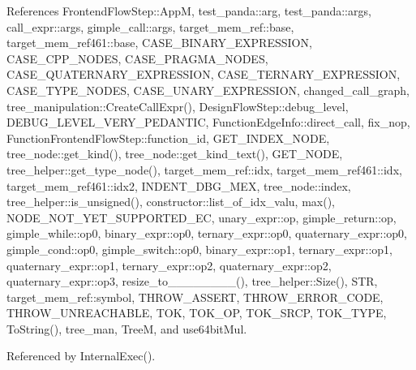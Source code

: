 References Frontend\+Flow\+Step\+::\+AppM, test\+\_\+panda\+::arg, test\+\_\+panda\+::args, call\+\_\+expr\+::args, gimple\+\_\+call\+::args, target\+\_\+mem\+\_\+ref\+::base, target\+\_\+mem\+\_\+ref461\+::base, C\+A\+S\+E\+\_\+\+B\+I\+N\+A\+R\+Y\+\_\+\+E\+X\+P\+R\+E\+S\+S\+I\+ON, C\+A\+S\+E\+\_\+\+C\+P\+P\+\_\+\+N\+O\+D\+ES, C\+A\+S\+E\+\_\+\+P\+R\+A\+G\+M\+A\+\_\+\+N\+O\+D\+ES, C\+A\+S\+E\+\_\+\+Q\+U\+A\+T\+E\+R\+N\+A\+R\+Y\+\_\+\+E\+X\+P\+R\+E\+S\+S\+I\+ON, C\+A\+S\+E\+\_\+\+T\+E\+R\+N\+A\+R\+Y\+\_\+\+E\+X\+P\+R\+E\+S\+S\+I\+ON, C\+A\+S\+E\+\_\+\+T\+Y\+P\+E\+\_\+\+N\+O\+D\+ES, C\+A\+S\+E\+\_\+\+U\+N\+A\+R\+Y\+\_\+\+E\+X\+P\+R\+E\+S\+S\+I\+ON, changed\+\_\+call\+\_\+graph, tree\+\_\+manipulation\+::\+Create\+Call\+Expr(), Design\+Flow\+Step\+::debug\+\_\+level, D\+E\+B\+U\+G\+\_\+\+L\+E\+V\+E\+L\+\_\+\+V\+E\+R\+Y\+\_\+\+P\+E\+D\+A\+N\+T\+IC, Function\+Edge\+Info\+::direct\+\_\+call, fix\+\_\+nop, Function\+Frontend\+Flow\+Step\+::function\+\_\+id, G\+E\+T\+\_\+\+I\+N\+D\+E\+X\+\_\+\+N\+O\+DE, tree\+\_\+node\+::get\+\_\+kind(), tree\+\_\+node\+::get\+\_\+kind\+\_\+text(), G\+E\+T\+\_\+\+N\+O\+DE, tree\+\_\+helper\+::get\+\_\+type\+\_\+node(), target\+\_\+mem\+\_\+ref\+::idx, target\+\_\+mem\+\_\+ref461\+::idx, target\+\_\+mem\+\_\+ref461\+::idx2, I\+N\+D\+E\+N\+T\+\_\+\+D\+B\+G\+\_\+\+M\+EX, tree\+\_\+node\+::index, tree\+\_\+helper\+::is\+\_\+unsigned(), constructor\+::list\+\_\+of\+\_\+idx\+\_\+valu, max(), N\+O\+D\+E\+\_\+\+N\+O\+T\+\_\+\+Y\+E\+T\+\_\+\+S\+U\+P\+P\+O\+R\+T\+E\+D\+\_\+\+EC, unary\+\_\+expr\+::op, gimple\+\_\+return\+::op, gimple\+\_\+while\+::op0, binary\+\_\+expr\+::op0, ternary\+\_\+expr\+::op0, quaternary\+\_\+expr\+::op0, gimple\+\_\+cond\+::op0, gimple\+\_\+switch\+::op0, binary\+\_\+expr\+::op1, ternary\+\_\+expr\+::op1, quaternary\+\_\+expr\+::op1, ternary\+\_\+expr\+::op2, quaternary\+\_\+expr\+::op2, quaternary\+\_\+expr\+::op3, resize\+\_\+to\+\_\+\_\+\_\+\_\+\_\+\_\+\_\+\_(), tree\+\_\+helper\+::\+Size(), S\+TR, target\+\_\+mem\+\_\+ref\+::symbol, T\+H\+R\+O\+W\+\_\+\+A\+S\+S\+E\+RT, T\+H\+R\+O\+W\+\_\+\+E\+R\+R\+O\+R\+\_\+\+C\+O\+DE, T\+H\+R\+O\+W\+\_\+\+U\+N\+R\+E\+A\+C\+H\+A\+B\+LE, T\+OK, T\+O\+K\+\_\+\+OP, T\+O\+K\+\_\+\+S\+R\+CP, T\+O\+K\+\_\+\+T\+Y\+PE, To\+String(), tree\+\_\+man, TreeM, and use64bit\+Mul.



Referenced by Internal\+Exec().

